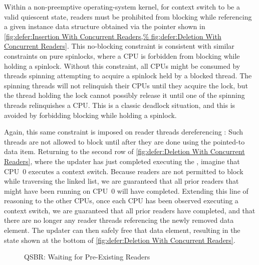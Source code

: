 Within a non-preemptive operating-system kernel, for context switch to be
a valid quiescent state, readers must be prohibited from blocking while
referencing a given instance data structure obtained via the 
pointer shown in
\cref{fig:defer:Insertion With Concurrent Readers,%
fig:defer:Deletion With Concurrent Readers}.
This no-blocking constraint is consistent with similar constraints
on pure spinlocks, where a CPU is forbidden from blocking while
holding a spinlock.
Without this constraint, all CPUs might be consumed by threads
spinning attempting to acquire a spinlock held by a blocked thread.
The spinning threads will not relinquish their CPUs until they acquire
the lock, but the thread holding the lock cannot possibly release it
until one of the spinning threads relinquishes a CPU\@.
This is a classic deadlock situation, and this  is avoided
by forbidding blocking while holding a spinlock.

Again, this same constraint is imposed on reader threads dereferencing
:
Such threads are not allowed to block until after
they are done using the pointed-to data item.
Returning to the second row of
\cref{fig:defer:Deletion With Concurrent Readers},
where the updater has just completed executing the ,
imagine that CPU~0 executes a context switch.
Because readers are not permitted to block while traversing the linked
list, we are guaranteed that all prior readers that might have been running on
CPU~0 will have completed.
Extending this line of reasoning to the other CPUs, once each CPU has
been observed executing a context switch, we are guaranteed that all
prior readers have completed, and that there are no longer any reader
threads referencing the newly removed data element.
The updater can then safely free that data element, resulting in the
state shown at the bottom of
\cref{fig:defer:Deletion With Concurrent Readers}.

\begin{figure}
\centering
{}
\caption{QSBR\@:
		 Waiting for Pre-Existing Readers}
\label{fig:defer:QSBR: Waiting for Pre-Existing Readers}
\end{figure}

